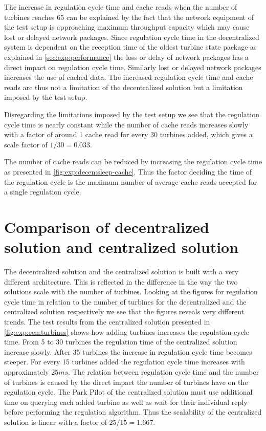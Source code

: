The increase in regulation cycle time and cache reads when the number of turbines reaches 65 can be explained by the fact that the network equipment of the test setup is approaching maximum throughput capacity which may cause lost or delayed network packages.
Since regulation cycle time in the decentralized system is dependent on the reception time of the oldest turbine state package as explained in \cref{sec:exp:performance} the loss or delay of network packages has a direct impact on regulation cycle time.
Similarly lost or delayed network packages increases the use of cached data. The increased regulation cycle time and cache reads are thus not a limitation of the decentralized solution but a limitation imposed by the test setup.

Disregarding the limitations imposed by the test setup we see that the regulation cycle time is nearly constant while the number of cache reads increases slowly with a factor of around 1 cache read for every 30 turbines added, which gives a scale factor of $1 / 30 = 0.033$.

The number of cache reads can be reduced by increasing the regulation cycle time as presented in \cref{fig:exp:decen:sleep-cache}.
Thus the factor deciding the time of the regulation cycle is the maximum number of average cache reads accepted for a single regulation cycle.

\section{Comparison of decentralized solution and centralized solution}
The decentralized solution and the centralized solution is built with a very different architecture. This is reflected in the difference in the way the two solutions scale with the number of turbines. Looking at the figures for regulation cycle time in relation to the number of turbines for the decentralized and the centralized solution respectively we see that the figures reveals very different trends. The test results from the centralized solution presented in \cref{fig:exp:cen:turbines} shows how adding turbines increases the regulation cycle time. From 5 to 30 turbines the regulation time of the centralized solution increase slowly. After 35 turbines the increase in regulation cycle time becomes steeper. For every 15 turbines added the regulation cycle time increases with approximately $25 ms$. The relation between regulation cycle time and the number of turbines is caused by the direct impact the number of turbines have on the regulation cycle. The Park Pilot of the centralized solution must use additional time on querying each added turbine as well as wait for their individual reply before performing the regulation algorithm. Thus the scalability of the centralized solution is linear with a factor of $25 / 15 = 1.667$.

